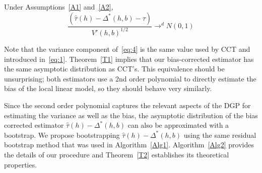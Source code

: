 \documentclass[12pt,fleqn]{article}
\begin{document}
\begin{theorem}\label{T1}
  Under Assumptions~\ref{A1} and~\ref{A2},
\begin{equation}
  \label{eq:4}
  \frac{(\hat\tau(h) - \Delta^{*}(h,b) - \tau)}{ V'(h, b)^{1/2}}
  \to^{d} N(0,1)
\end{equation}
\end{theorem}

Note that the variance component of~\eqref{eq:4} is the same value used by CCT
and introduced in~\eqref{eq:1}. Theorem~\ref{T1} implies that our bias-corrected
estimator has the same asymptotic distribution as CCT's. This equivalence should
be unsurprising; both estimators use a 2nd order polynomial to directly estimate
the bias of the local linear model, so they should behave very similarly.

Since the second order polynomial captures the relevant aspects of the DGP for
estimating the variance as well as the bias, the asymptotic distribution of the
bias corrected estimator $\hat\tau(h) - \Delta^*(h,b)$ can also be approximated
with a bootstrap. We propose bootstrapping $\hat\tau(h) - \Delta^*(h,b)$ using
the same residual bootstrap method that was used in
Algorithm~\ref{Alg1}. Algorithm~\ref{Alg2} provides the details of our procedure
and Theorem~\ref{T2} establishes its theoretical properties.
\end{document}
